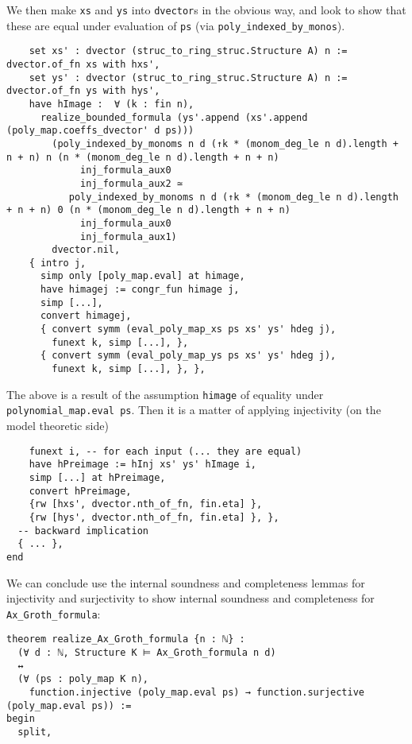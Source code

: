 We then make \texttt{xs} and \texttt{ys} into \texttt{dvector}s
in the obvious way,
and look to show that these are equal under evaluation
of \texttt{ps} (via \texttt{poly\_indexed\_by\_monos}).

\begin{lstlisting}
    set xs' : dvector (struc_to_ring_struc.Structure A) n := dvector.of_fn xs with hxs',
    set ys' : dvector (struc_to_ring_struc.Structure A) n := dvector.of_fn ys with hys',
    have hImage :  ∀ (k : fin n),
      realize_bounded_formula (ys'.append (xs'.append (poly_map.coeffs_dvector' d ps)))
        (poly_indexed_by_monoms n d (↑k * (monom_deg_le n d).length + n + n) n (n * (monom_deg_le n d).length + n + n)
             inj_formula_aux0
             inj_formula_aux2 ≃
           poly_indexed_by_monoms n d (↑k * (monom_deg_le n d).length + n + n) 0 (n * (monom_deg_le n d).length + n + n)
             inj_formula_aux0
             inj_formula_aux1)
        dvector.nil,
    { intro j,
      simp only [poly_map.eval] at himage,
      have himagej := congr_fun himage j,
      simp [...],
      convert himagej,
      { convert symm (eval_poly_map_xs ps xs' ys' hdeg j),
        funext k, simp [...], },
      { convert symm (eval_poly_map_ys ps xs' ys' hdeg j),
        funext k, simp [...], }, }, \end{lstlisting}

The above is a result of the assumption \texttt{himage} of equality
under \texttt{polynomial\_map.eval ps}.
Then it is a matter of applying injectivity (on the model theoretic side)

\begin{lstlisting}
    funext i, -- for each input (... they are equal)
    have hPreimage := hInj xs' ys' hImage i,
    simp [...] at hPreimage,
    convert hPreimage,
    {rw [hxs', dvector.nth_of_fn, fin.eta] },
    {rw [hys', dvector.nth_of_fn, fin.eta] }, },
  -- backward implication
  { ... },
end \end{lstlisting}

We can conclude use the internal soundness and completeness lemmas for
injectivity and surjectivity to show internal soundness and completeness
for \texttt{Ax\_Groth\_formula}:

\begin{lstlisting}
theorem realize_Ax_Groth_formula {n : ℕ} :
  (∀ d : ℕ, Structure K ⊨ Ax_Groth_formula n d)
  ↔
  (∀ (ps : poly_map K n),
    function.injective (poly_map.eval ps) → function.surjective (poly_map.eval ps)) :=
begin
  split,   \end{lstlisting}

